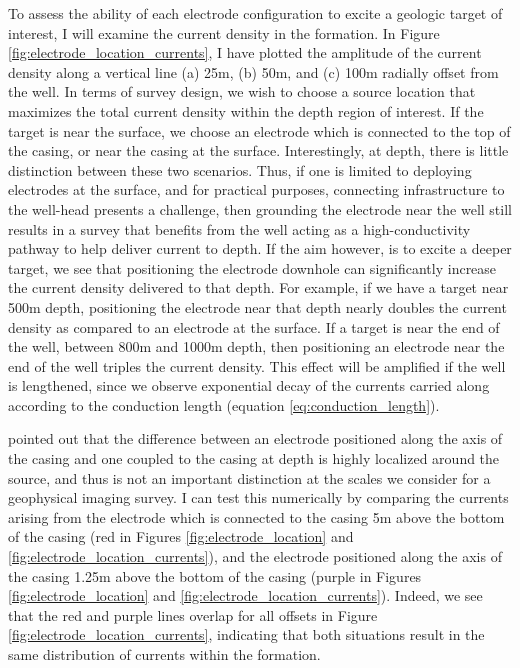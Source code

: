 

To assess the ability of each electrode configuration to excite a geologic target of interest, I will examine the current density in the formation. In Figure \ref{fig:electrode_location_currents}, I have plotted the amplitude of the current density along a vertical line (a) 25m, (b) 50m, and (c) 100m radially offset from the well. In terms of survey design, we wish to choose a source location that maximizes the total current density within the depth region of interest. If the target is near the surface, we choose an electrode which is connected to the top of the casing, or near the casing at the surface. Interestingly, at depth, there is little distinction between these two scenarios. Thus, if one is limited to deploying electrodes at the surface, and for practical purposes, connecting infrastructure to the well-head presents a challenge, then grounding the electrode near the well still results in a survey that benefits from the well acting as a high-conductivity pathway to help deliver current to depth. If the aim however, is to excite a deeper target, we see that positioning the electrode downhole can significantly increase the current density delivered to that depth. For example, if we have a target near 500m depth, positioning the electrode near that depth nearly doubles the current density as compared to an electrode at the surface. If a target is near the end of the well, between 800m and 1000m depth, then positioning an electrode near the end of the well triples the current density. This effect will be amplified if the well is lengthened, since we observe exponential decay of the currents carried along according to the conduction length (equation \ref{eq:conduction_length}).





\cite{Kaufman1990} pointed out that the difference between an electrode positioned along the axis of the casing and one coupled to the casing at depth is highly localized around the source, and thus is not an important distinction at the scales we consider for a geophysical imaging survey. I can test this numerically by comparing the currents arising from the electrode which is connected to the casing 5m above the bottom of the casing (red in Figures \ref{fig:electrode_location} and \ref{fig:electrode_location_currents}), and the electrode positioned along the axis of the casing 1.25m above the bottom of the casing (purple in Figures \ref{fig:electrode_location} and \ref{fig:electrode_location_currents}). Indeed, we see that the red and purple lines overlap for all offsets in Figure \ref{fig:electrode_location_currents}, indicating that both situations result in the same distribution of currents within the formation.

